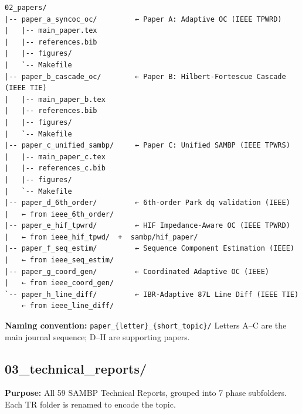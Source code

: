 \documentclass[11pt,a4paper]{article}
\begin{document}
\begin{verbatim}
02_papers/
|-- paper_a_syncoc_oc/         ← Paper A: Adaptive OC (IEEE TPWRD)
|   |-- main_paper.tex
|   |-- references.bib
|   |-- figures/
|   `-- Makefile
|-- paper_b_cascade_oc/        ← Paper B: Hilbert-Fortescue Cascade (IEEE TIE)
|   |-- main_paper_b.tex
|   |-- references.bib
|   |-- figures/
|   `-- Makefile
|-- paper_c_unified_sambp/     ← Paper C: Unified SAMBP (IEEE TPWRS)
|   |-- main_paper_c.tex
|   |-- references_c.bib
|   |-- figures/
|   `-- Makefile
|-- paper_d_6th_order/         ← 6th-order Park dq validation (IEEE)
|   ← from ieee_6th_order/
|-- paper_e_hif_tpwrd/         ← HIF Impedance-Aware OC (IEEE TPWRD)
|   ← from ieee_hif_tpwd/  +  sambp/hif_paper/
|-- paper_f_seq_estim/         ← Sequence Component Estimation (IEEE)
|   ← from ieee_seq_estim/
|-- paper_g_coord_gen/         ← Coordinated Adaptive OC (IEEE)
|   ← from ieee_coord_gen/
`-- paper_h_line_diff/         ← IBR-Adaptive 87L Line Diff (IEEE TIE)
    ← from ieee_line_diff/
\end{verbatim}

\textbf{Naming convention:} \texttt{paper\_\{letter\}\_\{short\_topic\}/}
Letters A--C are the main journal sequence; D--H are supporting papers.

\subsection{03\_technical\_reports/}

\begin{greenbox}
\textbf{Purpose:} All 59 SAMBP Technical Reports, grouped into 7 phase
subfolders. Each TR folder is renamed to encode the topic.
\end{greenbox}
\end{document}
